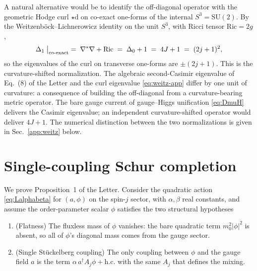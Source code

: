 \documentclass[aps,prd,onecolumn,superscriptaddress,nofootinbib,reprint]{revtex4-2}
\newcommand{\SU}{\mathrm{SU}}
\newcommand{\dd}{\mathrm{d}}
\begin{document}
A natural alternative would be to identify the off-diagonal operator
with the geometric Hodge curl $\star\dd$ on co-exact one-forms of the
internal $S^{3}=\SU(2)$.  By the Weitzenb\"ock--Lichnerowicz identity
on the unit $S^{3}$, with Ricci tensor $\mathrm{Ric}=2g$,
\begin{equation}
  \Delta_{1}\bigm|_{\rm co\text{-}exact}
  \;=\;\nabla^{*}\nabla+\mathrm{Ric}
  \;=\;\Delta_{0}+1
  \;=\;4J+1\;=\;(2j+1)^{2},
\label{eq:weitz-app}
\end{equation}
so the eigenvalues of the curl on transverse one-forms are
$\pm(2j+1)$.  This is the curvature-shifted normalization.  The
algebraic second-Casimir eigenvalue of Eq.~(8) of the Letter and the
curl eigenvalue \eqref{eq:weitz-app} differ by one unit of curvature:
a consequence of building the off-diagonal from a curvature-bearing
metric operator.  The bare gauge current of gauge--Higgs unification
\eqref{eq:DmuH} delivers the Casimir eigenvalue; an independent
curvature-shifted operator would deliver $4J+1$.  The numerical
distinction between the two normalizations is given in
Sec.~\ref{app:weitz} below.

\section{Single-coupling Schur completion}
\label{app:portal}

We prove Proposition~1 of the Letter.  Consider the quadratic action
\eqref{eq:Lalphabeta} for $(a,\phi)$ on the spin-$j$ sector, with
$\alpha,\beta$ real constants, and assume the order-parameter scalar
$\phi$ satisfies the two structural hypotheses

\begin{enumerate}
\item[(P1)] (Flatness) The fluxless mass of $\phi$ vanishes: the bare
quadratic term $m_{0}^{2}|\phi|^{2}$ is absent, so all of $\phi$'s
diagonal mass comes from the gauge sector.
\item[(P2)] (Single Stückelberg coupling) The only coupling between $\phi$ and the
gauge field $a$ is the term $\alpha\,a^{\dagger}A_{j}\phi+\mathrm{h.c.}$
with the same $A_{j}$ that defines the mixing.
\end{enumerate}
\end{document}
